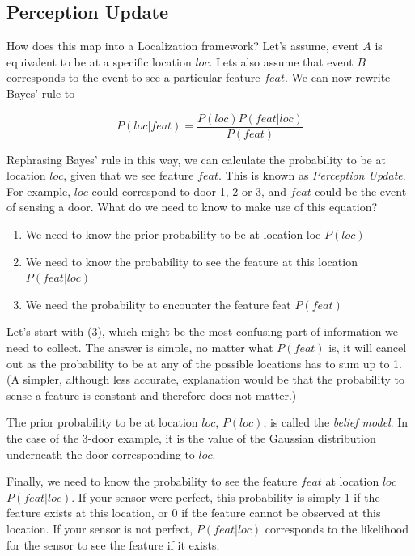 \subsection{Perception Update}
How does this map into a Localization framework? Let's assume, event $A$ is equivalent to be at a specific location $loc$. Lets also assume that event $B$ corresponds to the event to see a particular feature $feat$. We can now rewrite Bayes' rule to

\begin{equation}
P(loc|feat)=\frac{P(loc)P(feat|loc)}{P(feat)}
\end{equation}

Rephrasing Bayes' rule in this way, we can calculate the probability to be at location $loc$, given that we see feature $feat$. This is known as \emph{Perception Update}. For example, $loc$ could correspond to door 1, 2 or 3, and $feat$ could be the event of sensing a door. What do we need to know to make use of this equation?
\begin{enumerate}
\item We need to know the prior probability to be at location loc $P(loc)$
\item We need to know the probability to see the feature at this location $P(feat|loc)$
\item We need the probability to encounter the feature feat $P(feat)$
\end{enumerate}
Let's start with (3), which might be the most confusing part of information we need to collect. The answer is simple, no matter what $P(feat)$ is, it will cancel out as the probability to be at any of the possible locations has to sum up to 1. (A simpler, although less accurate, explanation would be that the probability to sense a feature is constant and therefore does not matter.)

The prior probability to be at location  $loc$, $P(loc)$, is called the  \emph{belief model}. In the case of the 3-door example, it is the value of the Gaussian distribution underneath the door corresponding to $loc$.

Finally, we need to know the probability to see the feature $feat$ at location $loc$ $P(feat|loc)$. If your sensor were perfect, this probability is simply 1 if the feature exists at this location, or 0 if the feature cannot be observed at this location. If your sensor is not perfect, $P(feat|loc)$ corresponds to the likelihood for the sensor to see the feature if it exists.

